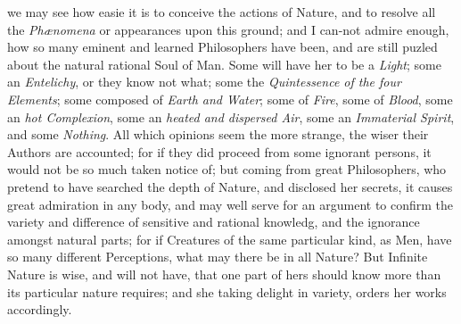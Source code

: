 we may see how easie it is to conceive the actions of Nature, and to
resolve all the \textit{Ph\ae nomena} or appearances upon this ground;
and I can-not admire enough, how so many eminent and
learned Philosophers have been, and are still puzled about the natural
rational Soul of Man. Some will have her to be a \textit{Light}; some
an \textit{Entelichy}, or they know not what; some the
\textit{Quintessence of the four Elements}; some composed of
\textit{Earth and Water}; some of \textit{Fire}, some of
\textit{Blood}, some an \textit{hot Complexion}, some an
\textit{heated and dispersed Air}, some an \textit{Immaterial
Spirit}, and some \textit{Nothing}. All which opinions seem the more
strange, the wiser their Authors are accounted; for if they did
proceed from some ignorant persons, it would not be so much taken
notice of; but coming from great Philosophers, who pretend to have
searched the depth of Nature, and disclosed her secrets, it causes
great admiration in any body, and may well serve for an argument to
confirm the variety and difference of sensitive and rational knowledg,
and the ignorance amongst natural parts; for if Creatures of the same
particular kind, as Men, have so many different Perceptions, what may
there be in all Nature? But Infinite Nature is wise, and will not
have, that one part of hers should know more than its particular
nature requires; and she taking delight in variety, orders her works
accordingly.

